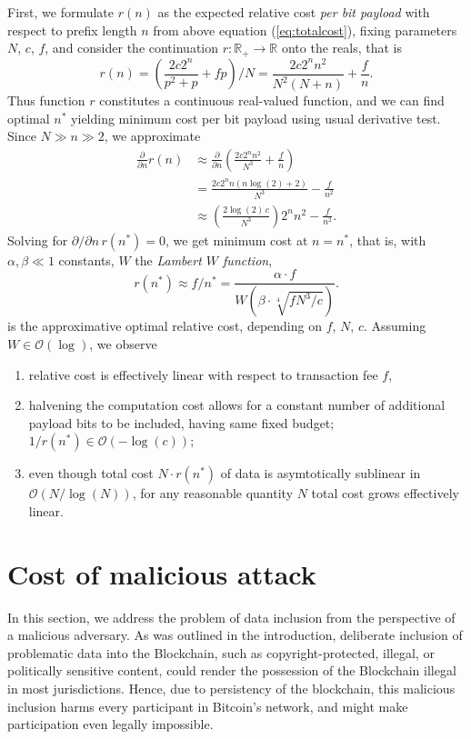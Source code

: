 \documentclass[10pt,a4paper,twocolumn]{article}
\begin{document}
First, we formulate $r(n)$ as the expected relative cost \emph{per bit payload} with respect to prefix length $n$ from above equation (\ref{eq:totalcost}), fixing parameters $N$, $c$, $f$, and consider the continuation $r\colon \mathbb{R}_+ \to \mathbb{R}$ onto the reals, that is
\[ 
    r(n) = \left(\frac{2c2^{n}}{p^2+p} + fp\right)/N = \frac{2c 2^{n} n^2}{N^2 (N+n)}+\frac{f}{n}. 
\]
Thus function $r$ constitutes a continuous real-valued function, and we can find optimal $n^*$ yielding minimum cost per bit payload using usual derivative test.
Since $N\gg n\gg 2$, we approximate
\begin{align*}
    \frac{\partial}{\partial n} r(n)   &\approx \frac{\partial}{\partial n} \left( \frac{2c 2^{n} n^2}{N^3}+\frac{f}{n} \right)\\
                                         &= \frac{2c 2^{n} n (n \log (2)+2)}{N^3}-\frac{f}{n^2}\\
                                         &\approx \left(\frac{2 \log (2)\,c}{N^3}\right) 2^{n} n^2 -\frac{f}{n^{2}}.
\end{align*}
Solving for $\partial/\partial n\, r(n^*)=0$, we get minimum cost at $n=n^*$, that is, with $\alpha, \beta \ll 1$ constants, $W$ the \emph{Lambert $W$ function},
\[ r(n^*) \approx f/n^* = \frac{\alpha\cdot f}{W\left(\beta\cdot\sqrt[4]{f N^3/c}\right)}. \]
is the approximative optimal relative cost, depending on $f$, $N$, $c$.
Assuming $W\in \mathcal{O}(\log)$, we observe
\begin{enumerate}
    \item relative cost is effectively linear with respect to transaction fee $f$,
    \item halvening the computation cost allows for a constant number of additional payload bits to be included, having same fixed budget; $1/r(n^*) \in \mathcal{O}(-\log(c))$;
    \item even though total cost $N\cdot r(n^*)$ of data is asymtotically sublinear in $\mathcal{O}(N / \log(N))$, for any reasonable quantity $N$ total cost grows effectively linear.
\end{enumerate}

\section{Cost of malicious attack}

In this section, we address the problem of data inclusion from the perspective of a malicious adversary.
As was outlined in the introduction, deliberate inclusion of problematic data into the Blockchain, such as copyright-protected, illegal, or politically sensitive content, could render the possession of the Blockchain illegal in most jurisdictions.
Hence, due to persistency of the blockchain, this malicious inclusion harms every participant in Bitcoin's network, and might make participation even legally impossible.
\end{document}
